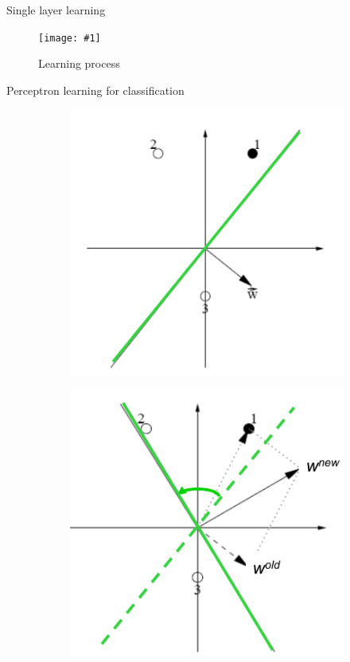 \documentclass[9pt,t]{beamer}
\newcommand{\picHereWidth}[4] { %
    \begin{figure}[htp] %
        \centering
        \texttt{[image: \#1]} %
        \caption{#2} %
        \label{#3}
    \end{figure} %
}
\begin{document}
\begin{frame}{Single layer learning}
    \picHereWidth{../images/learning.png}{Learning process}{fig:learning}{0.6\linewidth}
    \begin{alertblock}{Perceptron learning for classification}
        \begin{figure}[htp!]
            \centering
            \begin{subfigure}{.3\textwidth}
                \centering
                \includegraphics[width=\linewidth]{../images/perceptron_learning1.png}
            \end{subfigure}%
            \begin{subfigure}{.3\textwidth}
                \centering
                \includegraphics[width=\linewidth]{../images/perceptron_learning2.png}

\end{subfigure}
\end{figure}
\end{alertblock}
\end{frame}
\end{document}
